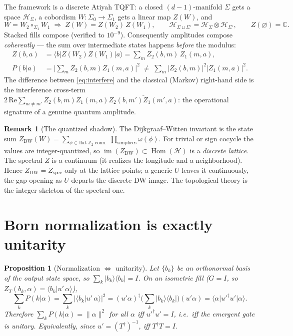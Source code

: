 \documentclass[11pt]{article}
\DeclareMathOperator{\Hom}{Hom}
\DeclareMathOperator{\im}{im}
\newcommand{\HH}{\mathcal{H}}
\newcommand{\C}{\mathbb{C}}
\newcommand{\Z}{\mathbb{Z}}
\newcommand{\ket}[1]{\lvert #1 \rangle}
\newcommand{\bra}[1]{\langle #1 \rvert}
\newcommand{\braket}[2]{\langle #1 \vert #2 \rangle}
\newcommand{\norm}[1]{\lVert #1 \rVert}
\newcommand{\abs}[1]{\lvert #1 \rvert}
\newcommand{\ZT}{Z_{T}}
\newcommand{\Zdw}{Z_{\mathrm{DW}}}
\newcommand{\Zsp}{Z_{\mathrm{spec}}}
\theoremstyle{plain}
\newtheorem{proposition}[theorem]{Proposition}
\theoremstyle{definition}
\newtheorem{remark}[theorem]{Remark}
\begin{document}
The framework is a discrete Atiyah TQFT: a closed $(d{-}1)$-manifold $\Sigma$ gets a space
$\HH_\Sigma$, a cobordism $W:\Sigma_0\to\Sigma_1$ gets a linear map $Z(W)$, and
\begin{equation}
  W=W_2\circ_{\Sigma_1}W_1 \;\Rightarrow\; Z(W)=Z(W_2)\,Z(W_1),\qquad
  \HH_{\Sigma\sqcup\Sigma'}=\HH_\Sigma\otimes\HH_{\Sigma'},\qquad Z(\varnothing)=\C.
  \label{eq:gluing}
\end{equation}
Stacked fills compose (verified to $10^{-9}$). Consequently amplitudes compose
\emph{coherently} --- the sum over intermediate states happens \emph{before} the modulus:
\begin{align}
  Z(b,a) &= \bra{b}Z(W_2)Z(W_1)\ket{a} = \sum_m Z_2(b,m)\,Z_1(m,a), \label{eq:cohere}\\
  P(b|a) &= \Big|\textstyle\sum_m Z_2(b,m)Z_1(m,a)\Big|^2
          \;\neq\; \sum_m \abs{Z_2(b,m)}^2\abs{Z_1(m,a)}^2. \label{eq:interfere}
\end{align}
The difference between \eqref{eq:interfere} and the classical (Markov) right-hand side is the
interference cross-term $2\,\mathrm{Re}\sum_{m\neq m'}\!Z_2(b,m)Z_1(m,a)\overline{Z_2(b,m')Z_1(m',a)}$:
the operational signature of a genuine quantum amplitude.

\begin{remark}[The quantized shadow]
The Dijkgraaf--Witten invariant is the state sum
$\Zdw(W)=\sum_{\phi\in\,\text{flat }\Z_2\text{-conn.}}\ \prod_{\text{simplices}}\omega(\phi)$.
For trivial or sign cocycle the values are integer-quantized, so $\im(\Zdw)\subset\Hom(\HH)$ is a
\emph{discrete lattice}. The spectral $Z$ is a continuum (it realizes the longitude and a
neighborhood). Hence $\Zdw=\Zsp$ only at the lattice points; a generic $U$ leaves it
continuously, the gap opening as $U$ departs the discrete DW image. The topological theory is
the integer skeleton of the spectral one.
\end{remark}

\section{Born normalization is exactly unitarity}
\label{sec:born}

\begin{proposition}[Normalization $\Leftrightarrow$ unitarity]
\label{prop:born}
Let $\{b_k\}$ be an orthonormal basis of the output state space, so
$\sum_k\ket{b_k}\bra{b_k}=I$. On an isometric fill ($G=I$, so
$\ZT(b_k,\alpha)=\braket{b_k}{u'\,\alpha}$),
\begin{equation}
  \sum_k P(k|\alpha) = \sum_k \abs{\braket{b_k}{u'\,\alpha}}^2
    = (u'\alpha)^\dagger\Big(\sum_k\ket{b_k}\bra{b_k}\Big)(u'\alpha)
    = \bra{\alpha}u'^\dagger u'\ket{\alpha}.
  \label{eq:born-sum}
\end{equation}
Therefore $\sum_k P(k|\alpha)=\norm{\alpha}^2$ for all $\alpha$ \emph{iff} $u'^\dagger u'=I$,
i.e.\ iff the emergent gate is unitary. Equivalently, since $u'=(T^\dagger)^{-1}$, iff
$T^\dagger T=I$.
\end{proposition}
\end{document}

